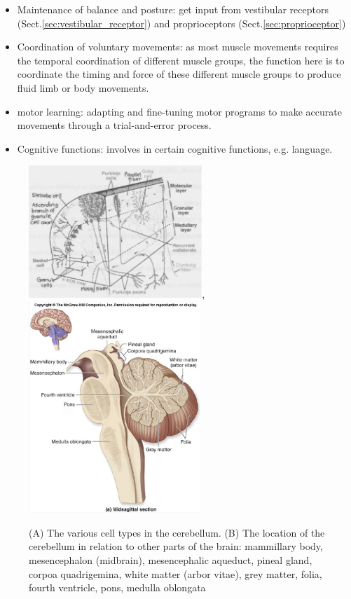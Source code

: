 \begin{itemize}
  \item Maintenance of balance and posture:
get input from vestibular receptors (Sect.\ref{sec:vestibular_receptor}) and
proprioceptors (Sect.\ref{sec:proprioceptor})

  \item Coordination of voluntary movements: as most muscle movements
  requires the temporal coordination of different muscle groups, the
  function here is to coordinate the timing and force of these different muscle
  groups to produce fluid limb or body movements.
  
  \item motor learning: adapting and fine-tuning motor programs to make accurate
  movements through a trial-and-error process.
  
  \item Cognitive functions: involves in certain cognitive functions, e.g.
  language.
\end{itemize}

\begin{figure}[hbt]
  \centerline{\includegraphics[height=5cm,
    angle=0]{./images/cerebellum.eps},\includegraphics[height=8cm,
    angle=0]{./images/brain_10.eps}}
  \caption{(A) The various cell types in the cerebellum. (B) The location of the
  cerebellum in relation to other parts of the brain:
  mammillary body, mesencephalon (midbrain), mesencephalic aqueduct, pineal
  gland, corpoa quadrigemina, white matter (arbor vitae), grey matter, folia,
  fourth ventricle, pons, medulla oblongata}
\label{fig:cerebellum_position}
\end{figure}

